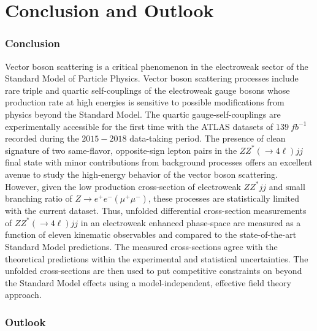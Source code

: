 \part {\LARGE{Conclusion and Outlook}}

\section{Conclusion}
\label{sec:Conclusion}

Vector boson scattering is a critical phenomenon in the electroweak sector of the Standard Model of Particle Physics. Vector boson scattering processes include rare triple and quartic self-couplings of the electroweak gauge bosons whose production rate at high energies is sensitive to possible modifications from physics beyond the Standard Model. The quartic gauge-self-couplings are experimentally accessible for the first time with the ATLAS datasets of $139 ~fb^{-1}$ recorded during the $2015-2018$ data-taking period. The presence of clean signature of two same-flavor, opposite-sign lepton pairs in the $ZZ^*(\rightarrow 4\ell) jj$ final state with minor contributions from background processes offers an excellent avenue to study the high-energy behavior of the vector boson scattering. However, given the low production cross-section of electroweak $ZZ^*jj$ and small branching ratio of $Z\rightarrow e^+e^- (\mu^+\mu^-)$, these processes are statistically limited with the current dataset. Thus, unfolded differential cross-section measurements of $ZZ^*(\rightarrow 4\ell) jj$ in an electroweak enhanced phase-space are measured as a function of eleven kinematic observables and compared to the state-of-the-art Standard Model predictions. The measured cross-sections agree with the theoretical predictions within the experimental and statistical uncertainties. The unfolded cross-sections are then used to put competitive constraints on beyond the Standard Model effects using a model-independent, effective field theory approach. 

\section{Outlook}
\label{sec:Outlook}

